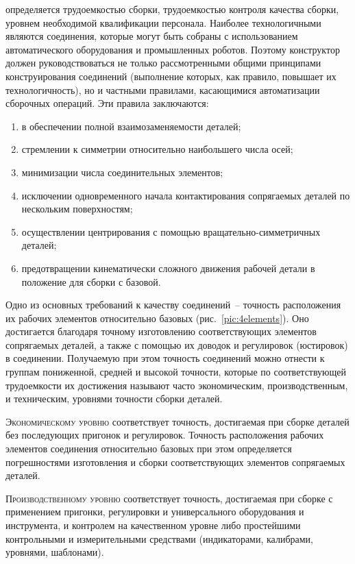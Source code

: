  определяется трудоемкостью сборки, трудоемкостью контроля качества сборки, уровнем необходимой квалификации персонала.
Наиболее технологичными являются соединения, которые могут быть собраны с использованием автоматического оборудования и промышленных роботов. 
Поэтому конструктор должен руководствоваться не только рассмотренными общими принципами конструирования соединений (выполнение которых, как правило, повышает их технологичность), но и частными правилами, касающимися автоматизации сборочных операций. 
Эти правила заключаются:
\begin{enumerate}
	\item в обеспечении полной взаимозаменяемости деталей;
	\item стремлении к симметрии относительно наибольшего числа осей;
	\item минимизации числа соединительных элементов;
	\item исключении одновременного начала контактирования сопрягаемых деталей по нескольким поверхностям;
	\item осуществлении центрирования с помощью вращательно-симметричных деталей;
	\item предотвращении кинематически сложного движения рабочей детали в положение для сборки с базовой.
\end{enumerate}

Одно из основных требований к качеству соединений~-- точность расположения их рабочих элементов относительно базовых (рис.~\ref{pic:4elements}). Оно достигается благодаря точному изготовлению соответствующих элементов сопрягаемых деталей, а также с помощью их доводок и регулировок (юстировок) в соединении. Получаемую при этом точность соединений можно отнести к группам пониженной, средней и высокой точности, которые по соответствующей трудоемкости их достижения называют часто экономическим, производственным, и техническим, уровнями точности сборки деталей.

\textsc{Экономическому уровню} соответствует точность, достигаемая при сборке деталей без последующих пригонок и регулировок. Точность расположения рабочих элементов соединения относительно базовых при этом определяется погрешностями изготовления и сборки соответствующих элементов сопрягаемых деталей.

\textsc{Производственному уровню} соответствует точность, достигаемая при сборке с применением пригонки, регулировки и универсального оборудования и инструмента, и контролем на качественном уровне либо простейшими контрольными и измерительными средствами (индикаторами, калибрами, уровнями, шаблонами).

